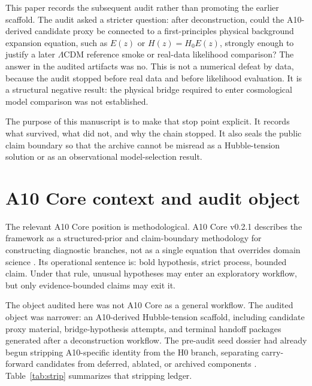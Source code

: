 \documentclass[11pt,a4paper]{article}
\newcommand{\LCDM}{$\Lambda$CDM}
\newcommand{\Ez}{$E(z)$}
\newcommand{\HzEq}{$H(z)=H_0E(z)$}
\begin{document}
This paper records the subsequent audit rather than promoting the earlier scaffold. The audit asked a stricter question: after deconstruction, could the A10-derived candidate proxy be connected to a first-principles physical background expansion equation, such as \Ez{} or \HzEq, strongly enough to justify a later \LCDM{} reference smoke or real-data likelihood comparison? The answer in the audited artifacts was no. This is not a numerical defeat by data, because the audit stopped before real data and before likelihood evaluation. It is a structural negative result: the physical bridge required to enter cosmological model comparison was not established.

The purpose of this manuscript is to make that stop point explicit. It records what survived, what did not, and why the chain stopped. It also seals the public claim boundary so that the archive cannot be misread as a Hubble-tension solution or as an observational model-selection result.

\section{A10 Core context and audit object}

The relevant A10 Core position is methodological. A10 Core v0.2.1 describes the framework as a structured-prior and claim-boundary methodology for constructing diagnostic branches, not as a single equation that overrides domain science \cite{YoshimuraA10Core2026}. Its operational sentence is: bold hypothesis, strict process, bounded claim. Under that rule, unusual hypotheses may enter an exploratory workflow, but only evidence-bounded claims may exit it.

The object audited here was not A10 Core as a general workflow. The audited object was narrower: an A10-derived Hubble-tension scaffold, including candidate proxy material, bridge-hypothesis attempts, and terminal handoff packages generated after a deconstruction workflow. The pre-audit seed dossier had already begun stripping A10-specific identity from the H0 branch, separating carry-forward candidates from deferred, ablated, or archived components \cite{SeedDossier2026}. Table~\ref{tab:strip} summarizes that stripping ledger.
\end{document}
